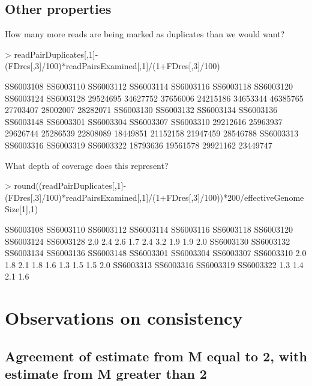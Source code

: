 \documentclass{article}
\begin{document}
\subsection{Other properties}

How many more reads are being marked as duplicates than we would want?

\begin{Schunk}
\begin{Sinput}
> readPairDuplicates[,1]-(FDres[,3]/100)*readPairsExamined[,1]/(1+FDres[,3]/100)
\end{Sinput}
\begin{Soutput}
SS6003108 SS6003110 SS6003112 SS6003114 SS6003116 SS6003118 SS6003120 SS6003124 SS6003128 
 29524695  34627752  37656006  24215186  34653344  46385765  27703407  28002007  28282071 
SS6003130 SS6003132 SS6003134 SS6003136 SS6003148 SS6003301 SS6003304 SS6003307 SS6003310 
 29212616  25963937  29626744  25286539  22808089  18449851  21152158  21947459  28546788 
SS6003313 SS6003316 SS6003319 SS6003322 
 18793636  19561578  29921162  23449747 
\end{Soutput}
\end{Schunk}

What depth of coverage does this represent?

\begin{Schunk}
\begin{Sinput}
> round((readPairDuplicates[,1]-(FDres[,3]/100)*readPairsExamined[,1]/(1+FDres[,3]/100))*200/effectiveGenomeSize[1],1)
\end{Sinput}
\begin{Soutput}
SS6003108 SS6003110 SS6003112 SS6003114 SS6003116 SS6003118 SS6003120 SS6003124 SS6003128 
      2.0       2.4       2.6       1.7       2.4       3.2       1.9       1.9       2.0 
SS6003130 SS6003132 SS6003134 SS6003136 SS6003148 SS6003301 SS6003304 SS6003307 SS6003310 
      2.0       1.8       2.1       1.8       1.6       1.3       1.5       1.5       2.0 
SS6003313 SS6003316 SS6003319 SS6003322 
      1.3       1.4       2.1       1.6 
\end{Soutput}
\end{Schunk}
\clearpage{}

\section{Observations on consistency}

\subsection{Agreement of estimate from M equal to 2, with estimate from M greater than 2}
\end{document}
